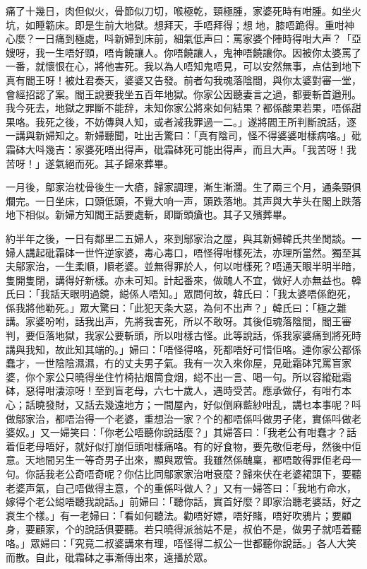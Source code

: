 \documentclass[a5paper, 12pt, openany]{book} %
\begin{document}
	痛了十幾日，肉但似火，骨節似刀切，喉極乾，頸極腫，家婆死時有咁腫。如坐火坑，如睡簕床。即是生前大地獄。想拜天，手唔拜得；想𨁍地，膝唔跪得。重咁神心麼？一日痛到極處，呌新婦到床前，細氣低声曰：罵家婆个陣時得咁大声？「亞嫂呀，我一生唔好頸，唔肯饒讓人。你唔饒讓人，鬼神唔饒讓你。因被你太婆罵了一番，就懷恨在心，將他害死。我以為人唔知鬼唔見，可以安然無事，点估到地下真有閻王呀！被灶君奏天，婆婆又告發。前者勾我魂落陰間，與你太婆對審一堂，會經招認了案。閻王說要我坐五百年地獄。你家公因聽妻言之過，都要斬首遒刑。我今死去，地獄之罪斷不能辞，未知你家公將來如何結果？都係酸果若果，唔係甜果咯。我死之後，不妨傳與人知，或者減我罪過一二。」遂將閻王所判斷說話，逐一講與新婦知之。新婦聽聞，吐出舌驚曰：「真有陰司，怪不得婆婆咁樣病咯。」砒霜砵大呌幾吉：家婆死唔出得声，砒霜砵死可能出得声，而且大声。「我苦呀！我苦呀！」遂氣絕而死。其子歸來葬畢。

	一月後，鄔家治枕骨後生一大瘡，歸家調理，漸生漸濶。生了兩三个月，通条頸俱爛完。一日坐床，口頭低頭，不覺大响一声，頭跌落地。其声與大芋头在閣上跌落地下相似。新婦方知閻王話要處斬，即斷頭瘡也。其子又殯葬畢。

	約半年之後，一日有鄰里二五婦人，來到鄔家治之屋，與其新婦韓氏共坐閒談。一婦人講起砒霜砵一世忤逆家婆，毒心毒口，唔怪得咁樣死法，亦理所當然。獨至其夫鄔家治，一生柔順，順老婆。並無得罪於人，何以咁樣死？唔通天眼半明半暗，隻開隻閉，講得好新樣。亦未可知。計起番來，做醜人不宜，做好人亦無益也。韓氏曰：「我話天眼明過鏡，縂係人唔知。」眾問何故，韓氏曰：「我太婆唔係飽死，係我將他勒死。」眾大驚曰：「此犯天条大惡，為何不出声？」韓氏曰：「極之難講。家婆吩咐，話我出声，先將我害死，所以不敢呀。其後佢魂落陰間，閻王審判，要佢落地獄，我家公要斬頭，所以咁樣古怪。此等說話，係我家婆痛到將死時講與我知，故此知其端的。」婦曰：「唔怪得咯，死都唔好可惜佢咯。連你家公都係蠢才，一世陰陰濕濕，冇的丈夫男子氣。我有一次入來你屋，見砒霜砵咒罵盲家婆，你个家公只曉得坐住竹椅拈烟筒食烟，縂不出一言、喝一句。所以容縱砒霜砵，惡得咁淒涼呀！至到盲老母，六七十歲人，遇時受苦。應承做仔，有咁冇本心；話曉發財，又話去幾遠地方；一間屋內，好似倒麻藍紗咁乱，講乜本事呢？呌做鄔家治，都唔治得一个老婆，重想治一家？个的都唔係呌做男子佬，實係呌做老婆奴。」又一婦笑曰：「你老公唔聽你說話麼？」其婦答曰：「我老公有咁蠢才？話着佢老母唔好，就好似打崩佢頭咁樣痛咯。有的好食物，要先敬佢老母，然後中佢意。天地間另生一等奇男子出來，顯與眾管。我雖然係醜稟，都唔敢得罪佢老母一句。你話我老公奇唔奇呢？你估比同鄔家家治咁衰麼？歸來伏在老婆裙頭下，要聽老婆声氣，自己唔做得主意，个的重係呌做人？」又有一婦答曰：「我地冇命水，嫁得个老公縂唔聽我說話。」前婦曰：「聽你話，實首好麼？即家治聽老婆話，好之衰生个樣。」有一老婦曰：「看如何聽法。勸唔好嫖，唔好賭，唔好吹鴉片；要顧身，要顧家，个的說話俱要聽。若只曉得派翁姑不是，叔伯不是，做男子就唔着聽咯。」眾婦曰：「究竟二叔婆講來有理，唔怪得二叔公一世都聽你說話。」各人大笑而散。自此，砒霜砵之事漸傳出來，遠播於眾。
\end{document}
